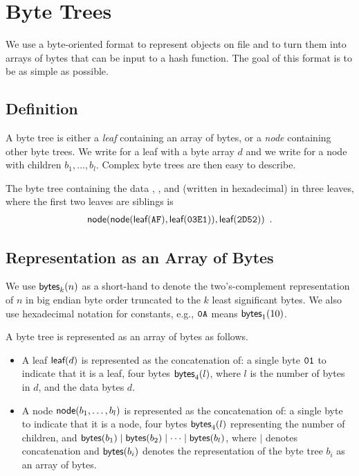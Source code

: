 \section{Byte Trees}\label{sect:bytetrees}

We use a byte-oriented format to represent objects on file and to turn
them into arrays of bytes that can be input to a hash function. The
goal of this format is to be as simple as possible.

\subsection{Definition}

A byte tree is either a \emph{leaf} containing an array of bytes, or a
\emph{node} containing other byte trees. We write  for a
leaf with a byte array $d$ and we write  for a
node with children $b_1,\ldots,b_l$. Complex byte trees are then easy
to describe.

\begin{example}\label{exam:bytetree}
  The byte tree containing the data , , and
   (written in hexadecimal) in three leaves, where the first
  two leaves are siblings is
\begin{align*}
  \textsf{node}(\textsf{node}(\textsf{leaf}(\texttt{AF}), \textsf{leaf}(\texttt{03E1})), \textsf{leaf}(\texttt{2D52}))\enspace.
\end{align*}
\end{example}

\subsection{Representation as an Array of Bytes}

We use $\textsf{bytes}_{k}(n)$ as a short-hand to denote the two's-complement
representation of $n$ in big endian byte order truncated to the $k$
least significant bytes. We also use hexadecimal notation for
constants, e.g., $\texttt{0A}$ means $\textsf{bytes}_{1}(10)$.

A byte tree is represented as an array of bytes as follows.
\begin{itemize}

\item A leaf $\textsf{leaf}(d)$ is represented as the concatenation of: a
  single byte $\texttt{01}$ to indicate that it is a leaf, four bytes
  $\textsf{bytes}_{4}(l)$, where $l$ is the number of bytes in $d$, and the
  data bytes $d$.

\item A node $\textsf{node}(b_1,\ldots,b_l)$ is represented as the
  concatenation of: a single byte  to indicate that it is a
  node, four bytes $\textsf{bytes}_{4}(l)$ representing the number of
  children, and $\textsf{bytes}(b_1)\mid\textsf{bytes}(b_2)\mid\cdots\mid\textsf{bytes}(b_l)$,
  where $\mid$ denotes concatenation and $\textsf{bytes}(b_i)$ denotes the
  representation of the byte tree $b_i$ as an array of bytes.

\end{itemize}

